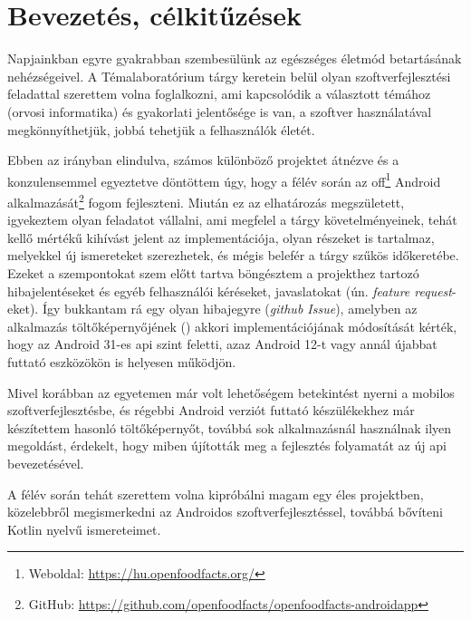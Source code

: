 \chapter{Bevezetés, célkitűzések}
Napjainkban egyre gyakrabban szembesülünk az egészséges életmód betartásának nehézségeivel.
A Témalaboratórium tárgy keretein belül olyan szoftverfejlesztési feladattal szerettem volna
foglalkozni, ami kapcsolódik a választott témához (orvosi informatika) és gyakorlati
jelentősége is van, a szoftver használatával megkönnyíthetjük, jobbá tehetjük a felhasználók életét.

Ebben az irányban elindulva, számos különböző projektet átnézve és a konzulensemmel egyeztetve
döntöttem úgy, hogy a félév során az \acrlong{off}\footnote{Weboldal: \url{https://hu.openfoodfacts.org/}}
Android alkalmazását\footnote{GitHub: \url{https://github.com/openfoodfacts/openfoodfacts-androidapp}} fogom fejleszteni.
Miután ez az elhatározás megszületett, igyekeztem olyan feladatot vállalni,
ami megfelel a tárgy követelményeinek, tehát kellő mértékű kihívást jelent
az implementációja, olyan részeket is tartalmaz, melyekkel új ismereteket szerezhetek, és mégis
belefér a tárgy szűkös időkeretébe. Ezeket a szempontokat szem előtt tartva böngésztem a
projekthez tartozó hibajelentéseket és egyéb felhasználói kéréseket, javaslatokat (ún. \textit{feature request}-eket).
Így bukkantam rá egy olyan hibajegyre (\textit{\gls{github} Issue}), amelyben az alkalmazás
töltőképernyőjének () akkori implementációjának módosítását kérték, hogy
az Android 31-es \acrshort{api} szint feletti, azaz Android 12-t vagy annál újabbat futtató eszközökön
is helyesen működjön.

Mivel korábban az egyetemen már volt lehetőségem betekintést nyerni a mobilos szoftverfejlesztésbe,
és régebbi Android verziót futtató készülékekhez már készítettem hasonló töltőképernyőt, továbbá
sok alkalmazásnál használnak ilyen megoldást, érdekelt, hogy miben újították meg a fejlesztés
folyamatát az új \acrshort{api} bevezetésével.

A félév során tehát szerettem volna kipróbálni magam egy éles projektben, közelebbről megismerkedni
az Androidos szoftverfejlesztéssel, továbbá bővíteni Kotlin nyelvű ismereteimet.
